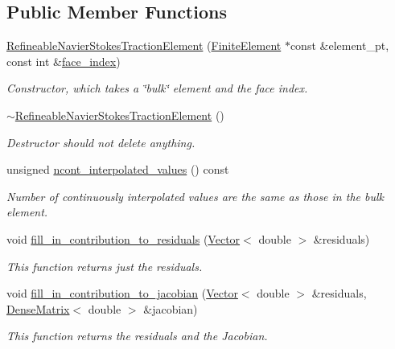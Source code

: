 \subsection*{Public Member Functions}
\begin{DoxyCompactItemize}
\item 
\hyperlink{classoomph_1_1RefineableNavierStokesTractionElement_ac3f4ca74a1c159962de935ffd1da46e9}{Refineable\+Navier\+Stokes\+Traction\+Element} (\hyperlink{classoomph_1_1FiniteElement}{Finite\+Element} $\ast$const \&element\+\_\+pt, const int \&\hyperlink{classoomph_1_1FaceElement_a478d577ac6db67ecc80f1f02ae3ab170}{face\+\_\+index})
\begin{DoxyCompactList}\small\item\em Constructor, which takes a \char`\"{}bulk\char`\"{} element and the face index. \end{DoxyCompactList}\item 
\hyperlink{classoomph_1_1RefineableNavierStokesTractionElement_ae99e7e53ea523fc1876c62f0e6598245}{$\sim$\+Refineable\+Navier\+Stokes\+Traction\+Element} ()
\begin{DoxyCompactList}\small\item\em Destructor should not delete anything. \end{DoxyCompactList}\item 
unsigned \hyperlink{classoomph_1_1RefineableNavierStokesTractionElement_aacf85441dd068c931aca90171e1e20fb}{ncont\+\_\+interpolated\+\_\+values} () const
\begin{DoxyCompactList}\small\item\em Number of continuously interpolated values are the same as those in the bulk element. \end{DoxyCompactList}\item 
void \hyperlink{classoomph_1_1RefineableNavierStokesTractionElement_a994d2a7986cd7802f9062de227bf9481}{fill\+\_\+in\+\_\+contribution\+\_\+to\+\_\+residuals} (\hyperlink{classoomph_1_1Vector}{Vector}$<$ double $>$ \&residuals)
\begin{DoxyCompactList}\small\item\em This function returns just the residuals. \end{DoxyCompactList}\item 
void \hyperlink{classoomph_1_1RefineableNavierStokesTractionElement_a67eea13f9a419e35576b6183f0438bab}{fill\+\_\+in\+\_\+contribution\+\_\+to\+\_\+jacobian} (\hyperlink{classoomph_1_1Vector}{Vector}$<$ double $>$ \&residuals, \hyperlink{classoomph_1_1DenseMatrix}{Dense\+Matrix}$<$ double $>$ \&jacobian)
\begin{DoxyCompactList}\small\item\em This function returns the residuals and the Jacobian. \end{DoxyCompactList}\end{DoxyCompactItemize}
